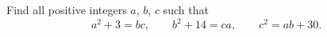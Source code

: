 Find all positive integers $a$, $b$, $c$ such that
\[
a^2+3=bc,\qquad b^2+14=ca,\qquad c^2=ab+30 .
\]
